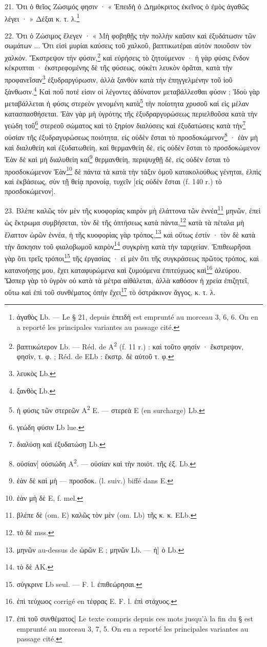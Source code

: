 \documentclass[a4paper, 11pt, oneside, polutonikogreek, french]{article}
\begin{document}
21. Ὅτι ὁ θεῖος Ζώσιμός φησιν · « Ἐπειδὴ ὁ Δημόκριτος ἐκεῖνος ὁ ἐμὸς ἀγαθῶς λέγει · » Δέξαι κ. τ. λ.\footnote{ἀγαθὸς Lb. --- Le § 21, depuis ἐπειδὴ est emprunté au morceau 3, 6, 6. On en a reporté les principales variantes au passage cité.}

22. Ὅτι ὁ Ζώσιμος ἔλεγεν · « Μὴ φοβηθῇς τὴν πολλὴν καῦσιν καὶ ἐξυδάτωσιν τῶν σωμάτων ... Ὅτι εἰσὶ μυρίαι καύσεις τοῦ χαλκοῦ, βαπτικωτέραι αὐτὸν ποιοῦσιν τὸν χαλκόν. Ἔκστρεψον τὴν φύσιν,\footnote{βαπτικώτερον Lb. --- Réd. de A\textsuperscript{2} (f. 11 r.) : καὶ τοῦτο φησίν · ἔκστρεψον, φησὶν, τ. φ. ; Réd. de ELb : ἔκστρ. δὲ αὐτοῦ τ. φ.} καὶ εὑρήσεις τὸ ζητούμενον · ἡ γὰρ φύσις ἔνδον κέκρυπται · ἐκστρεφομένης δὲ τῆς φύσεως, οὐκέτι λευκὸν ὁρᾶται, κατὰ τὴν προφανεῖσαν\footnote{λευκὸς Lb.} ἐξυδραργύρωσιν, ἀλλὰ ξανθὸν κατὰ τὴν ἐπηγγελμένην τοῦ ἰοῦ ξάνθωσιν.\footnote{ξανθὸς Lb.} Καὶ ποῦ ποτέ εἰσιν οἱ λέγοντες ἀδύνατον μεταβάλλεσθαι φύσιν ; Ἰδοὺ γὰρ μεταβάλλεται ἡ φύσις στερεὸν γενομένη κατὰ\footnote{ἡ φύσις τῶν στερεῶν A\textsuperscript{2} E. --- στερεὰ E (en surcharge) Lb.} τὴν ποίοτητα χρυσοῦ καὶ εἰς μέλαν κατασπασθήσεται. Ἐὰν γὰρ μὴ ὑγρότης τῆς ἐξυδραργυρώσεως περιελθοῦσα κατὰ τὴν γεώδη τοῦ\footnote{γεώδη φύσιν Lb lue.} στερεοῦ σώματος καὶ τὸ ξηρίον διαλύσεις καὶ ἐξυδατώσεις κατὰ τὴν\footnote{διαλύσῃ καὶ ἐξυδατώσῃ Lb.} οὐσίαν τῆς ἐξυδραγυρώσεως ποιότητα, εἰς οὐδὲν ἔσται τὸ προσδοκώμενον\footnote{οὐσίαν] οὐσιώδη A\textsuperscript{2}. --- οὐσίαν καὶ τὴν ποιότ. τῆς ἐξ. Lb.} · ἐὰν μὴ καὶ διαλυθείη καὶ ἐξυδατωθείη, καὶ θερμανθείη δὲ, εἰς οὐδὲν ἔσται τὸ προσδοκώμενον Ἐὰν δὲ καὶ μὴ διαλυθείη καὶ\footnote{ἐὰν δὲ καὶ μὴ --- προσδοκ. (l. suiv.) biffé dans E.} θερμανθείη, περιψυχθῇ δὲ, εἰς οὐδὲν ἔσται τὸ προσδοκώμενον Ἐὰν\footnote{ἐὰν μὴ δὲ E, f. mel.} δὲ πάντα τὰ κατὰ τὴν τάξιν ὁμοῦ κατακολούθως γένηται, ἐλπὶς καὶ ἑκβάσεως, σὺν τῇ θείᾳ προνοίᾳ, τυχεῖν [εἰς οὐδὲν ἔσται (f. 140 r.) τὸ προσδοκώμενον].

23. Βλέπε καλῶς τὸν μὲν τῆς κυοφορίας καιρὸν μὴ ἐλάττονα τῶν ἐννέα\footnote{βλέπε δὲ (om. E) καλῶς τὸν μὲν (om. Lb) τῆς κ. κ. ELb.} μηνῶν, ἐπεὶ ὡς ἔκτρωμα συμβήσεται, τὸν δὲ τῆς ὁπτήσεως κατὰ πάντα,\footnote{τὸ δὲ mss.} κατὰ τὰ πέταλα μὴ ἔλαττον ὡρῶν ἐννέα, ἡ τῆς κυοφορίας γὰρ τρόπος,\footnote{μηνῶν au-dessus de ὡρῶν E ; μηνῶν Lb. --- ἡ] ὁ Lb.} καὶ οὕτως ἐστίν · τὸν δὲ κατὰ τὴν ἄσκησιν τοῦ φιαλοβωμοῦ καιρὸν\footnote{τὸ δὲ AK.} συγκρίνῃ κατὰ τὴν ταριχείαν. Ἐπιθεωρῆσαι γὰρ ὅτι τρεῖς τρόποι\footnote{σύγκρινε Lb seul. --- F. l. ἐπιθεώρησαι.} τῆς ἐργασίας · εἰ μὲν ὅτι τῆς συγκράσεως πρῶτος τρόπος, καὶ κατανοήσῃς μου, ἔχει καταφυρώμενα καὶ ζυμούμενα ἐπιτεύχωος καὶ\footnote{ἐπὶ τεύχωος corrigé en τέφρας E. F. l. ἐπὶ στάχυος.} ἀλεύρου. Ὥσπερ γὰρ τὸ ὑγρὸν οὐ κατὰ τὰ μέτρα αἰθάλεται, ἀλλὰ καθόσον ἡ χρεία ἐπιζητεῖ, οὕτω καὶ ἐπὶ τοῦ συνθέματος ὀπὴν ἔχει\footnote{ἐπὶ τοῦ συνθέματος] Le texte compris depuis ces mots jusqu'à la fin du § est emprunté au morceau 3, 7, 5. On en a reporté les principales variantes au passage cité.} τὸ ὀστράκινον ἄγγος, κ. τ. λ.
\end{document}
